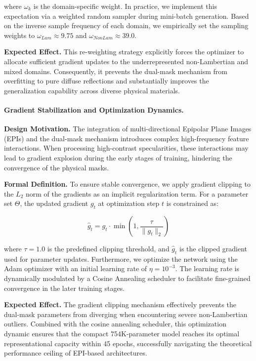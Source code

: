 where $\omega_k$ is the domain-specific weight. In practice, we implement this expectation via a weighted random sampler during mini-batch generation. Based on the inverse sample frequency of each domain, we empirically set the sampling weights to $\omega_{Lam} \approx 9.75$ and $\omega_{NonLam} \approx 39.0$. 

\textbf{Expected Effect.} This re-weighting strategy explicitly forces the optimizer to allocate sufficient gradient updates to the underrepresented non-Lambertian and mixed domains. Consequently, it prevents the dual-mask mechanism from overfitting to pure diffuse reflections and substantially improves the generalization capability across diverse physical materials.

\paragraph{Gradient Stabilization and Optimization Dynamics.}

\textbf{Design Motivation.} The integration of multi-directional Epipolar Plane Images (EPIs) and the dual-mask mechanism introduces complex high-frequency feature interactions. When processing high-contrast specularities, these interactions may lead to gradient explosion during the early stages of training, hindering the convergence of the physical masks.

\textbf{Formal Definition.} To ensure stable convergence, we apply gradient clipping to the $L_2$ norm of the gradients as an implicit regularization term. For a parameter set $\Theta$, the updated gradient $g_t$ at optimization step $t$ is constrained as:

\begin{equation}
\label{eq:eq29}
\hat{g}_t = g_t \cdot \min\left(1, \frac{\tau}{\|g_t\|_2}\right)
\end{equation}

where $\tau = 1.0$ is the predefined clipping threshold, and $\hat{g}_t$ is the clipped gradient used for parameter updates. Furthermore, we optimize the network using the Adam optimizer with an initial learning rate of $\eta = 10^{-3}$. The learning rate is dynamically modulated by a Cosine Annealing scheduler to facilitate fine-grained convergence in the later training stages.

\textbf{Expected Effect.} The gradient clipping mechanism effectively prevents the dual-mask parameters from diverging when encountering severe non-Lambertian outliers. Combined with the cosine annealing scheduler, this optimization dynamic ensures that the compact 754K-parameter model reaches its optimal representational capacity within 45 epochs, successfully navigating the theoretical performance ceiling of EPI-based architectures.